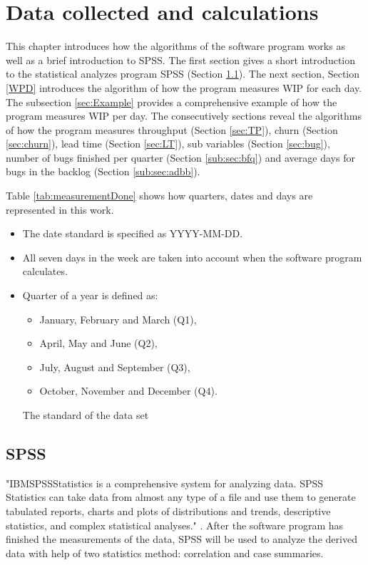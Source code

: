 \documentclass[UKenglish]{ifimaster}  %
\begin{document}
\chapter{Data collected and calculations}
\label{ch:DCC}
This chapter introduces how the algorithms of the software program works as well as a brief introduction to SPSS.  The first section gives a short introduction to the statistical analyzes program SPSS  (Section \ref{sec:SPSS}). The next section, Section \ref{WPD} introduces the algorithm of how the program measures WIP for each day. The subsection \ref{sec:Example} provides a comprehensive example of how the program measures WIP per day. The consecutively sections reveal the algorithms of how the program measures  throughput (Section \ref{sec:TP}),  churn (Section \ref{sec:churn}),  lead time (Section \ref{sec:LT}), sub variables (Section \ref{sec:bug}), number of bugs finished per quarter (Section  \ref{sub:sec:bfq}) and average days for bugs in the backlog (Section \ref{sub:sec:adbb}). 

Table \ref{tab:measurementDone} shows how quarters, dates and days are represented in this work. 

\begin{table}[!ht]
\centering
\begin{itemize}
\item The date standard is specified as YYYY-MM-DD.
\item All seven days in the week are taken into account when the software program calculates.
\item Quarter of a year is defined as: 
\begin{itemize}
\item January, February and March (Q1),
\item April, May and June (Q2),
\item July, August and September (Q3),
\item October, November and December (Q4).
\end{itemize}
\parencite{Quarter}
\caption{The standard of the data set}
\label{tab:measurementDone}
\end{itemize}
\end{table}



\section{SPSS}
\label{sec:SPSS}
"IBM\circledR  SPSS\circledR Statistics is a comprehensive system for analyzing data. SPSS Statistics can take data from almost any type of a file and use them to generate tabulated reports, charts and plots of distributions and trends, descriptive statistics, and complex statistical analyses." \parencite{IBM}. After the software program has finished the measurements of the data, SPSS will be used to analyze the derived data with help of two statistics method: correlation and case summaries. 
\end{document}
